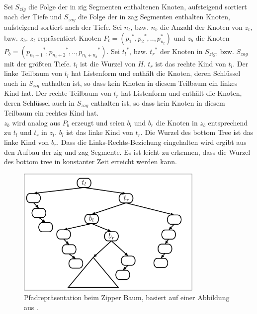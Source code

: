 \documentclass[a4paper,12pt]{article}
\begin{document}
Sei $S_{zig}$ die Folge der in zig Segmenten enthaltenen Knoten, aufsteigend sortiert nach der Tiefe und $S_{zag}$ die Folge der in zag Segmenten enthalten Knoten, aufsteigend sortiert nach der Tiefe.  Sei $n_t$, bzw. $n_b$ die Anzahl der Knoten von $z_t$, bzw. $z_b$. $z_t$ repräsentiert Knoten  $P_t = \left({p_1}^*,{p_2}^*,..,p_{n_t}^*\right)$ und $z_b$ die Knoten  $P_b = \left({p_{n_t + 1}}^*,{p_{n_t + 2}}^*,..,{p_{n_t + n_b}}^*\right)$.
Sei ${t_l}^*$, bzw. ${t_r}^*$ der Knoten in $S_{zig}$, bzw. $S_{zag}$ mit der größten Tiefe. $t_l$ ist die Wurzel von $H$. $t_r$ ist das rechte Kind von $t_l$. Der linke Teilbaum von $t_l$  hat Listenform und  enthält die  Knoten, deren Schlüssel auch in  $S_{zig}$ enthalten ist, so dass kein Knoten in diesem Teilbaum ein linkes Kind hat. Der rechte Teilbaum von $t_r$  hat Listenform und  enthält die  Knoten, deren Schlüssel auch in $S_{zag}$ enthalten ist, so dass kein Knoten in diesem Teilbaum ein rechtes Kind hat. \\
$z_b$ wird analog aus $P_b$ erzeugt und seien $b_l$ und $b_r$ die Knoten in $z_b$ entsprechend zu $t_l$ und $t_r$ in $z_t$. $b_l$ ist das linke Kind von $t_r$. Die Wurzel des bottom Tree ist das linke Kind von $b_r$. Dass die Links-Rechts-Beziehung eingehalten wird ergibt aus den Aufbau der zig und zag Segmente. Es ist leicht zu erkennen, dass die Wurzel des bottom tree in konstanter Zeit erreicht werden kann.
\begin{figure}[H]
	\includegraphics[width= 0.8\textwidth]{Medien/Zipper/zipperPathRep}
	\caption{Pfadrepräsentation beim Zipper Baum, basiert auf einer Abbildung aus \cite{zipper}. }
	\label{fig:zipperPathRep}
\end{figure}
\end{document}
